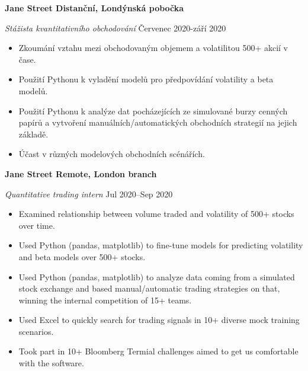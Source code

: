 \ifczech

\textbf{Jane Street \hfill Distanční, Londýnská pobočka} \par
\textit{Stážista kvantitativního obchodování} \hfill Červenec 2020-září 2020 \par
\begin{itemize}
	\item Zkoumání vztahu mezi obchodovaným objemem a volatilitou 500+ akcií v čase.
\item Použití Pythonu k vyladění modelů pro předpovídání volatility a beta modelů.
\item Použití Pythonu k analýze dat pocházejících ze simulované burzy cenných papírů a vytvoření manuálních/automatických obchodních strategií na jejich základě.
\item Účast v různých modelových obchodních scénářích.
\end{itemize} \par

\else

\textbf{Jane Street \hfill  Remote, London branch} \par
\textit{Quantitative trading intern} \hfill Jul 2020--Sep 2020 \par
\begin{itemize}
	\item Examined relationship between volume traded and volatility of 500+ stocks over time.
	\item Used Python (pandas, matplotlib) to fine-tune models for predicting volatility and beta models over 500+ stocks.
	\item Used Python (pandas, matplotlib) to analyze data coming from a simulated stock exchange and based manual/automatic trading strategies on that, winning the internal competition of 15+ teams.
	\item Used Excel to quickly search for trading signals in 10+ diverse mock training scenarios.
	\item Took part in 10+ Bloomberg Termial challenges aimed to get us comfortable with the software.
\end{itemize} \par

\fi